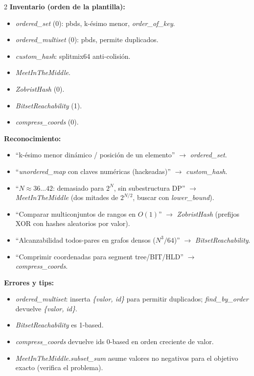\documentclass[10pt]{article}
\begin{document}
\begin{multicols}{2}
\textbf{Inventario (orden de la plantilla):}
\begin{itemize}\setlength{\itemsep}{1pt}
  \item \textit{ordered\_set} (0): pbds, k-ésimo menor, \textit{order\_of\_key}.
  \item \textit{ordered\_multiset} (0): pbds, permite duplicados.
  \item \textit{custom\_hash}: splitmix64 anti-colisión.
  \item \textit{MeetInTheMiddle}.
  \item \textit{ZobristHash} (0).
  \item \textit{BitsetReachability} (1).
  \item \textit{compress\_coords} (0).
\end{itemize}

\textbf{Reconocimiento:}
\begin{itemize}\setlength{\itemsep}{1pt}
  \item ``k-ésimo menor dinámico / posición de un elemento'' $\to$ \textit{ordered\_set}.
  \item ``\textit{unordered\_map} con claves numéricas (hackeadas)'' $\to$ \textit{custom\_hash}.
  \item ``$N \approx 36\dots42$: demasiado para $2^N$, sin subestructura DP'' $\to$ \textit{MeetInTheMiddle} (dos mitades de $2^{N/2}$, buscar con \textit{lower\_bound}).
  \item ``Comparar multiconjuntos de rangos en $O(1)$'' $\to$ \textit{ZobristHash} (prefijos XOR con hashes aleatorios por valor).
  \item ``Alcanzabilidad todos-pares en grafos densos ($N^3/64$)'' $\to$ \textit{BitsetReachability}.
  \item ``Comprimir coordenadas para segment tree/BIT/HLD'' $\to$ \textit{compress\_coords}.
\end{itemize}

\textbf{Errores y tips:}
\begin{itemize}\setlength{\itemsep}{1pt}
  \item \textit{ordered\_multiset}: inserta \textit{\{valor, id\}} para permitir duplicados; \textit{find\_by\_order} devuelve \textit{\{valor, id\}}.
  \item \textit{BitsetReachability} es 1-based.
  \item \textit{compress\_coords} devuelve ids 0-based en orden creciente de valor.
  \item \textit{MeetInTheMiddle.subset\_sum} asume valores no negativos para el objetivo exacto (verifica el problema).
\end{itemize}


\end{multicols}
\end{document}

